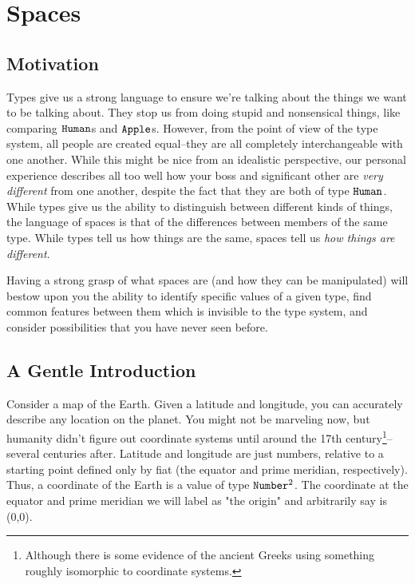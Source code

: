 \documentclass[12pt]{book}
\newcommand{\subtitle}[1]{}
\newcommand{\type}[1]{\ensuremath{\text{\texttt{#1}}}}
\newcommand{\coord}[1]{(#1)}
\begin{document}
\chapter{Spaces}
\subtitle{The Language of Possibilities}
\subtitle{The Language of Low Structure}
\section{Motivation}
Types give us a strong language to ensure we're talking about the things we want to be talking about. They stop us from
doing stupid and nonsensical things, like comparing \type{Human}s and \type{Apple}s. However, from the point of view
of the type system, all people are created equal--they are all completely interchangeable with one another. While this
might be nice from an idealistic perspective, our personal experience describes all too well how your boss and
significant other are \textit{very different} from one another, despite the fact that they are both of type
\type{Human}. While types give us the ability to distinguish between different kinds of things, the language of spaces
is that of the differences between members of the same type. While types tell us how things are the same, spaces tell us
\textit{how things are different}.

Having a strong grasp of what spaces are (and how they can be manipulated) will bestow upon you the ability to
identify specific values of a given type, find common features between them which is invisible to the type system, and
consider possibilities that you have never seen before.


\section{A Gentle Introduction}
Consider a map of the Earth. Given a latitude and longitude, you can accurately describe any location on the planet. You
might not be marveling now, but humanity didn't figure out coordinate systems until around the 17th
century\footnote{Although there is some evidence of the ancient Greeks using something roughly isomorphic to coordinate
systems.}--several centuries after. Latitude and longitude are
just numbers, relative to a starting point defined only by fiat (the equator and prime meridian, respectively). Thus, a
coordinate of the Earth is a value of type $\type{Number}^2$. The coordinate at the equator and prime meridian we will
label as "the origin" and arbitrarily say is \coord{0,0}.
\end{document}
